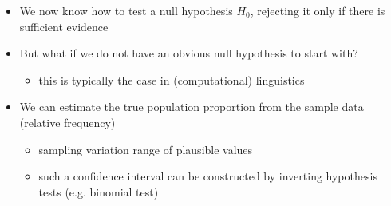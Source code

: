 \documentclass[a4paper,landscape,headrule,footrule,dvips]{foils}
\begin{document}
\begin{CJK}{UTF8}{min}
\begin{itemize}
\end{itemize}


 \begin{itemize}
 \item We now know how to test a null hypothesis $H_0$,
   rejecting it only if there is sufficient evidence
 \item But what if we do not have an obvious
   null hypothesis to start with?
   \begin{itemize}
 \item this is typically the case in (computational) linguistics
 \end{itemize}
\item We can estimate the true population proportion
from the sample data (relative frequency)
\begin{itemize}
\item sampling variation \into range of plausible values
\item such a confidence interval can be constructed by
inverting hypothesis tests (e.g. binomial test)
\end{itemize}
\end{itemize}


\end{CJK}
\end{document}
